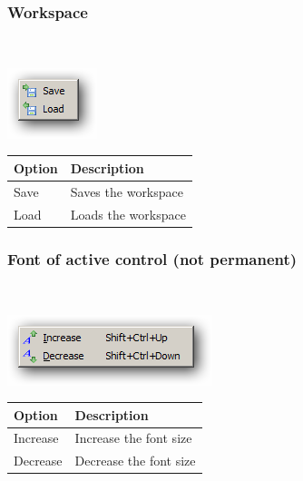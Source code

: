\hypertarget{menu_r_rterm_workspace}{}
\subsubsection{Workspace}\\

\includegraphics[scale=0.50]{./res/menu_r_rterm_workspace.png}\\

\begin{scriptsize}\begin{tabularx}{\textwidth}{>{\hsize=0.3\hsize}X>{\hsize=0.7\hsize}X}\\
    \hline
    \textbf{Option} & \textbf{Description} \\
    \hline
    Save & Saves the workspace \\
    Load & Loads the workspace \\
    \hline
  \end{tabularx}\end{scriptsize}


\hypertarget{menu_r_rterm_fontsize}{}
\subsubsection{Font of active control (not permanent)}\\

\includegraphics[scale=0.50]{./res/menu_fontsize_generic.png}\\

\begin{scriptsize}\begin{tabularx}{\textwidth}{>{\hsize=0.3\hsize}X>{\hsize=0.7\hsize}X}\\
    \hline
    \textbf{Option} & \textbf{Description} \\
    \hline
    Increase & Increase the font size \\
    Decrease & Decrease the font size \\
    \hline
  \end{tabularx}\end{scriptsize}


